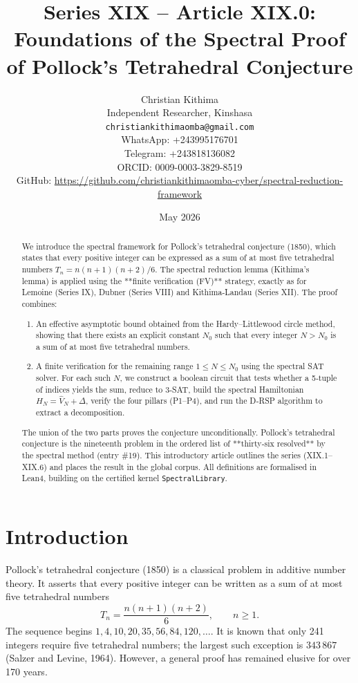 \documentclass[11pt,a4paper]{article}
\title{Series XIX – Article XIX.0: Foundations of the Spectral Proof of Pollock's Tetrahedral Conjecture}
\author{Christian Kithima \\
Independent Researcher, Kinshasa \\
\texttt{christiankithimaomba@gmail.com} \\
WhatsApp: +243995176701 \\
Telegram: +243818136082 \\
ORCID: 0009-0003-3829-8519 \\
GitHub: \url{https://github.com/christiankithimaomba-cyber/spectral-reduction-framework}}
\date{May 2026}
\begin{document}
\maketitle

\begin{abstract}
We introduce the spectral framework for Pollock's tetrahedral conjecture (1850), which states that every positive integer can be expressed as a sum of at most five tetrahedral numbers
\(T_n = n(n+1)(n+2)/6\). The spectral reduction lemma (Kithima's lemma) is applied using the **finite verification (FV)** strategy, exactly as for Lemoine (Series IX), Dubner (Series VIII) and Kithima‑Landau (Series XII). The proof combines:
\begin{enumerate}
\item An effective asymptotic bound obtained from the Hardy–Littlewood circle method, showing that there exists an explicit constant \(N_0\) such that every integer \(N > N_0\) is a sum of at most five tetrahedral numbers.
\item A finite verification for the remaining range \(1 \le N \le N_0\) using the spectral SAT solver. For each such \(N\), we construct a boolean circuit that tests whether a 5‑tuple of indices yields the sum, reduce to 3‑SAT, build the spectral Hamiltonian \(H_N = \hat{V}_N + \Delta\), verify the four pillars (P1–P4), and run the D‑RSP algorithm to extract a decomposition.
\end{enumerate}
The union of the two parts proves the conjecture unconditionally. Pollock's tetrahedral conjecture is the nineteenth problem in the ordered list of **thirty‑six resolved** by the spectral method (entry \#19). This introductory article outlines the series (XIX.1–XIX.6) and places the result in the global corpus. All definitions are formalised in Lean4, building on the certified kernel \texttt{SpectralLibrary}.
\end{abstract}

\tableofcontents

\section{Introduction}

Pollock's tetrahedral conjecture (1850) is a classical problem in additive number theory. It asserts that every positive integer can be written as a sum of at most five tetrahedral numbers
\[
T_n = \frac{n(n+1)(n+2)}{6},\qquad n\ge 1.
\]
The sequence begins \(1,4,10,20,35,56,84,120,\dots\). It is known that only 241 integers require five tetrahedral numbers; the largest such exception is \(343\,867\) (Salzer and Levine, 1964). However, a general proof has remained elusive for over 170 years.
\end{document}

